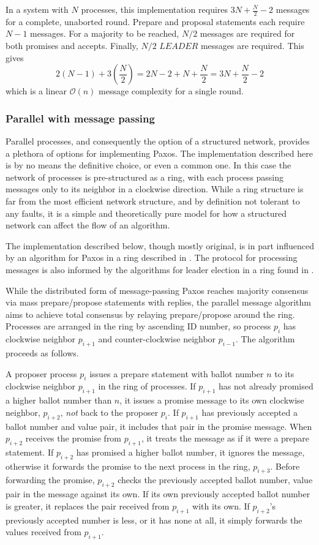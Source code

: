 \documentclass[12pt]{article}
\renewcommand{\O}{\mathcal{O}}
\begin{document}
In a system with $N$ processes, this implementation requires
$3N + \frac{N}{2} - 2$ messages for a complete, unaborted round.
Prepare and proposal statements each require $N-1$ messages. For a majority
to be reached, $N/2$ messages are required for both promises and accepts.
Finally, $N/2$ $LEADER$ messages are required.
This gives
$$2(N - 1) + 3(\frac{N}{2}) = 2N - 2 + N + \frac{N}{2} = 3N + \frac{N}{2} - 2$$
which is a linear $\O(n)$ message complexity for a single round.

\subsubsection{Parallel with message passing}
Parallel processes, and consequently the option of a structured network,
provides a plethora of options for implementing Paxos. The implementation described
here is by no means the definitive choice, or even a common one. In this case
the network of processes is pre-structured as a ring, with each process passing
messages only to its neighbor in a clockwise direction. While a ring structure
is far from the most efficient network structure, and by definition not tolerant
to any faults, it is a simple and theoretically pure model for how a structured
network can affect the flow of an algorithm.

The implementation described below, though mostly original,
is in part influenced by an algorithm for Paxos in a ring described in \cite{ring}.
The protocol for processing messages is also informed by the algorithms
for leader election in a ring found in \cite{lynch}.

While the distributed form of message-passing Paxos reaches majority consensus
via mass prepare/propose statements with replies, the parallel message algorithm
aims to achieve total consensus by relaying prepare/propose around the ring.
Processes are arranged in the ring by ascending ID number, so process $p_i$
has clockwise neighbor $p_{i+1}$ and counter-clockwise neighbor $p_{i-1}$.
The algorithm proceeds as follows.

A proposer process $p_i$ issues a prepare statement with ballot number $n$
to its clockwise neighbor $p_{i+1}$ in the ring of processes. If $p_{i+1}$
has not already promised a higher ballot number than $n$, it issues a promise
message to its own clockwise neighbor, $p_{i+2}$, \textit{not} back to the
proposer $p_i$. If $p_{i+1}$ has previously accepted a ballot number and value
pair, it includes that pair in the promise message. When $p_{i+2}$ receives the promise
from $p_{i+1}$, it treats the message as if it were a prepare statement. If $p_{i+2}$
has promised a higher ballot number, it ignores the message, otherwise it forwards
the promise to the next process in the ring, $p_{i+3}$. Before forwarding the promise,
$p_{i+2}$ checks the previously accepted ballot number, value pair in the message
against its own. If its own previously accepted ballot number is greater, it
replaces the pair received from $p_{i+1}$ with its own. If $p_{i+2}$'s previously
accepted number is less, or it has none at all, it simply forwards the values
received from $p_{i+1}$.
\end{document}
